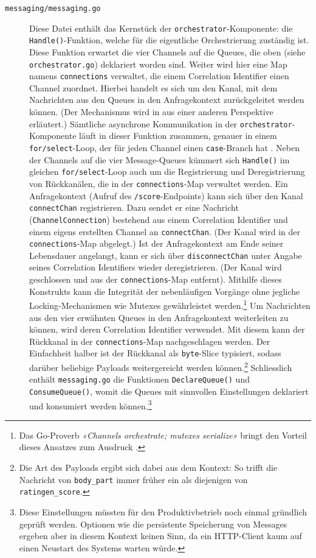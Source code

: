 \begin{description}
    \item[\texttt{messaging/messaging.go}] Diese Datei enthält das Kernstück der \texttt{orchestrator}-Kom\-po\-nen\-te: die \texttt{Handle()}-Funktion, welche für die eigentliche Orchestrierung zuständig ist. Diese Funktion erwartet die vier Channels auf die Queues, die oben (siehe \texttt{orchestrator.go}) deklariert worden sind. Weiter wird hier eine Map namens \texttt{connections} verwaltet, die einem Correlation Identifier einen Channel zuordnet. Hierbei handelt es sich um den Kanal, mit dem Nachrichten aus den Queues in den Anfragekontext zurückgeleitet werden können. (Der Mechanismus wird in  aus einer anderen Perspektive erläutert.) Sämtliche asynchrone Kommunikation in der \texttt{orchestrator}-Komponente läuft in dieser Funktion zusammen, genauer in einem \texttt{for/select}-Loop, der für jeden Channel einen \texttt{case}-Branch hat \cite[Kapitel 8.7]{gopl}. Neben der Channels auf die vier Message-Queues kümmert sich \texttt{Handle()} im gleichen \texttt{for/select}-Loop auch um die Registrierung und Deregistrierung von Rückkanälen, die in der \texttt{connections}-Map verwaltet werden. Ein Anfragekontext (Aufruf des \texttt{/score}-Endpoints) kann sich über den Kanal \texttt{connectChan} registrieren. Dazu sendet er eine Nachricht (\texttt{Chan\-nel\-Connection}) bestehend aus einem Correlation Identifier und einem eigens erstellten Channel an \texttt{connectChan}. (Der Kanal wird in der \texttt{connections}-Map abgelegt.) Ist der Anfragekontext am Ende seiner Lebensdauer angelangt, kann er sich über \texttt{disconnectChan} unter Angabe seines Correlation Identifiers wieder deregistrieren. (Der Kanal wird geschlossen und aus der \texttt{connections}-Map entfernt). Mithilfe dieses Konstrukts kann die Integrität der nebenläufigen Vorgänge ohne jegliche Locking-Mechanismen wie Mutexes gewährleistet werden.\footnote{Das Go-Proverb \textit{«Channels orchestrate; mutexes serialize»} bringt den Vorteil dieses Ansatzes zum Ausdruck \cite[4:21]{go-proverbs}.} Um Nachrichten aus den vier erwähnten Queues in den Anfragekontext weiterleiten zu können, wird deren Correlation Identifier verwendet. Mit diesem kann der Rückkanal in der \texttt{con\-nec\-tions}-Map nachgeschlagen werden. Der Einfachheit halber ist der Rückkanal als \texttt{byte}-Slice typisiert, sodass darüber beliebige Payloads weitergereicht werden können.\footnote{Die Art des Payloads ergibt sich dabei aus dem Kontext: So trifft die Nachricht von \texttt{body\_part} immer früher ein als diejenigen von \texttt{ratingen\_score}.} Schliesslich enthält \texttt{messaging.go} die Funktionen \texttt{DeclareQueue()} und \texttt{ConsumeQueue()}, womit die Queues mit sinnvollen Einstellungen deklariert und konsumiert werden können.\footnote{Diese Einstellungen müssten für den Produktivbetrieb noch einmal gründlich geprüft werden. Optionen wie die persistente Speicherung von Messages ergeben aber in diesem Kontext keinen Sinn, da ein HTTP-Client kaum auf einen Neustart des Systems warten würde.}

\end{description}
